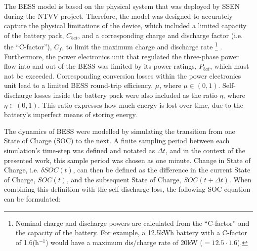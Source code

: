 
The BESS model is based on the physical system that was deployed by SSEN during the NTVV project.
Therefore, the model was designed to accurately capture the physical limitations of the device, which included a limited capacity of the battery pack, $C_{bat}$, and a corresponding charge and discharge factor (i.e. the ``C-factor''), $C_{f}$, to limit the maximum charge and discharge rate
\footnote{Nominal charge and discharge powers are calculated from the ``C-factor'' and the capacity of the battery. For example, a 12.5kWh battery with a C-factor of 1.6(h$^{-1}$) would have a maximum dis/charge rate of 20kW ($=12.5 \cdot 1.6$).}
.
Furthermore, the power electronics unit that regulated the three-phase power flow into and out of the BESS was limited by its power ratings, $P_{bat}$, which must not be exceeded.
Corresponding conversion losses within the power electronics unit lead to a limited BESS round-trip efficiency, $\mu$, where $\mu \in (0, 1)$.
Self-discharge losses inside the battery pack were also included as the ratio $\eta$, where $\eta \in (0, 1)$.
This ratio expresses how much energy is lost over time, due to the battery's imperfect means of storing energy.

The dynamics of BESS were modelled by simulating the transition from one State of Charge (SOC) to the next.
A finite sampling period between each simulation's time-step was defined and notated as $\Delta t$, and in the context of the presented work, this sample period was chosen as one minute.
Change in State of Charge, i.e. $\delta SOC(t)$, can then be defined as the difference in the current State of Charge, $SOC(t)$, and the subsequent State of Charge, $SOC(t+\Delta t)$.
When combining this definition with the self-discharge loss, the following SOC equation can be formulated:

